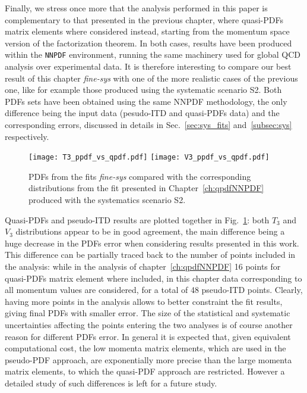 %
Finally, we stress once more that the analysis performed in this paper is complementary to that 
presented in the previous chapter, where quasi-PDFs matrix elements where considered instead, 
starting from the momentum space version of the factorization theorem. 
In both cases, results have been produced within the {\tt NNPDF} environment,
running the same machinery used for global QCD analysis over experimental data. 
It is therefore interesting to compare our best result of this chapter \textit{fine-sys} with
one of the more realistic cases of the previous one, like for example those produced using the
systematic scenario S2. 
Both PDFs sets have been obtained using the same NNPDF methodology, the only difference 
being the input data (pesudo-ITD and quasi-PDFs data) and the corresponding errors,
discussed in details in Sec.~\ref{sec:sys_fits} and~\ref{subsec:sys} respectively.
\begin{figure}[h!]
    \center
    \texttt{[image: T3\_ppdf\_vs\_qpdf.pdf]}
    \texttt{[image: V3\_ppdf\_vs\_qpdf.pdf]}
    \caption{PDFs from the fits \textit{fine-sys} compared with the corresponding distributions from 
    the fit presented in Chapter~\ref{ch:qpdfNNPDF} produced with the systematics scenario S2.}
    \label{fig::ppdf_vs_qpdf}
\end{figure} 
Quasi-PDFs and pseudo-ITD results are plotted together in Fig.~\ref{fig::ppdf_vs_qpdf}: 
both $T_3$ and $V_3$ distributions appear to be in good agreement, the main difference being a huge decrease in the 
PDFs error when considering results presented in this work. 
This difference can be partially traced back to the number of points included in the analysis: while in the analysis of 
chapter~\ref{ch:qpdfNNPDF} 16 points for quasi-PDFs matrix element where included, 
in this chapter data corresponding to all momentum values are considered, for a total of 48 pseudo-ITD points.
Clearly, having more points in the analysis allows to better constraint the fit results, giving final PDFs with smaller error.
%
The size of the statistical and systematic uncertainties affecting the points entering the two analyses is of course another
reason for different PDFs error.
In general it is expected that, given equivalent computational cost,
the low momenta matrix elements, which are used in the pseudo-PDF approach,
are exponentially more precise than the large momenta matrix elements, to which the quasi-PDF approach are restricted. 
However a detailed study of such differences is left for a future study.

